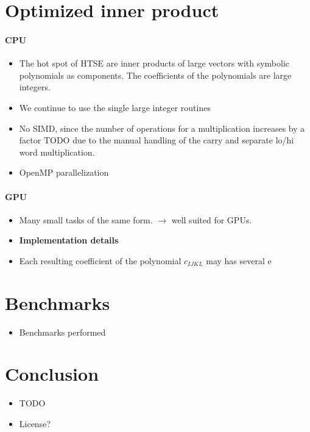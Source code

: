 \documentclass[oribibl]{llncs2e/llncs}
\begin{document}
\section{Optimized inner product}
\paragraph{CPU}
\begin{itemize}
\item The hot spot of HTSE are inner products of large vectors with symbolic polynomials as components. The coefficients of the polynomials are large integers.
\item We continue to use the single large integer routines
\item No SIMD, since the number of operations for a multiplication increases by a factor TODO due to the manual handling of the carry and separate lo/hi word multiplication.
\item OpenMP parallelization
\end{itemize}
\paragraph{GPU}
\begin{itemize}
\item Many small tasks of the same form. $\rightarrow$ well suited for GPUs.
\item {\bf Implementation details}
\item Each resulting coefficient of the polynomial $c_{IJKL}$ may has several e
\end{itemize}

\section{Benchmarks}
\begin{itemize}
\item Benchmarks performed
\end{itemize}


\section{Conclusion}
\begin{itemize}
\item TODO
\item License?
\end{itemize}

\end{document}

